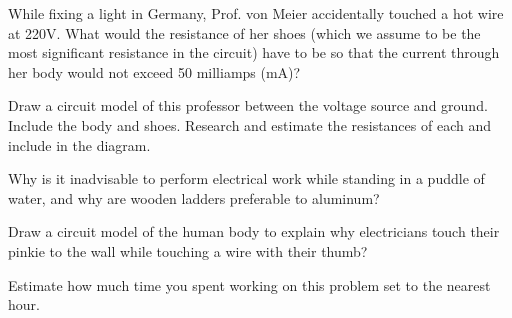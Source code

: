 \documentclass{article}
\begin{document}

\subproblem
While fixing a light in Germany, Prof. von Meier accidentally
touched a hot wire at 220V.  What would the resistance of her shoes
(which we assume to be the most significant resistance in the
circuit) have to be so that the current through her body would not
exceed 50 milliamps (mA)?

\subproblem
Draw a circuit model of this professor between the voltage source and
ground.  Include the body and shoes.  Research and estimate the
resistances of each and include in the diagram.

\subproblem
Why is it inadvisable to perform electrical work while standing
in a puddle of water, and why are wooden ladders preferable to
aluminum?

\subproblem
Draw a circuit model of the human body to explain why electricians touch
their pinkie to the wall while touching a wire with their thumb?

%
%
%
%
%
%
%
%
%
%
%


%
%


Estimate how much time you spent working on this problem set to the
nearest hour.
\end{document}
